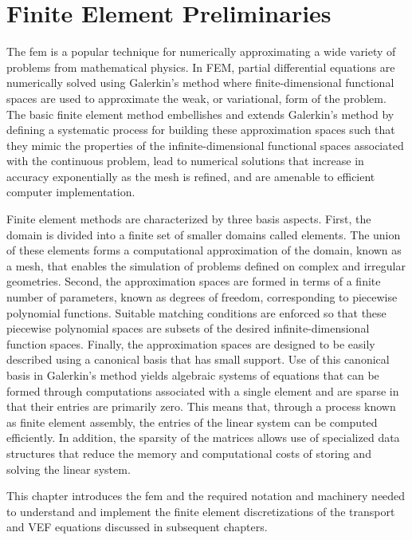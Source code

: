\documentclass[../doc.tex]{subfiles}
\begin{document}
\chapter{Finite Element Preliminaries} \label{chap:fem}
The \gls{fem} is a popular technique for numerically approximating a wide variety of problems from mathematical physics. In FEM, partial differential equations are numerically solved using Galerkin's method where finite-dimensional functional spaces are used to approximate the weak, or variational, form of the problem.
The basic finite element method embellishes and extends Galerkin's method by defining a systematic process for building these approximation spaces such that they mimic the properties of the infinite-dimensional functional spaces associated with the continuous problem, lead to numerical solutions that increase in accuracy exponentially as the mesh is refined, and are amenable to efficient computer implementation. 

Finite element methods are characterized by three basis aspects. First, the domain is divided into a finite set of smaller domains called elements. The union of these elements forms a computational approximation of the domain, known as a mesh, that enables the simulation of problems defined on complex and irregular geometries. Second, the approximation spaces are formed in terms of a finite number of parameters, known as degrees of freedom, corresponding to piecewise polynomial functions. 
Suitable matching conditions are enforced so that these piecewise polynomial spaces are subsets of the desired infinite-dimensional function spaces. 
Finally, the approximation spaces are designed to be easily described using a canonical basis that has small support. Use of this canonical basis in Galerkin's method yields algebraic systems of equations that can be formed through computations associated with a single element and are sparse in that their entries are primarily zero. This means that, through a process known as finite element assembly, the entries of the linear system can be computed efficiently. In addition, the sparsity of the matrices allows use of specialized data structures that reduce the memory and computational costs of storing and solving the linear system.

This chapter introduces the \gls{fem} and the required notation and machinery needed to understand and implement the finite element discretizations of the transport and VEF equations discussed in subsequent chapters. 
\end{document}
